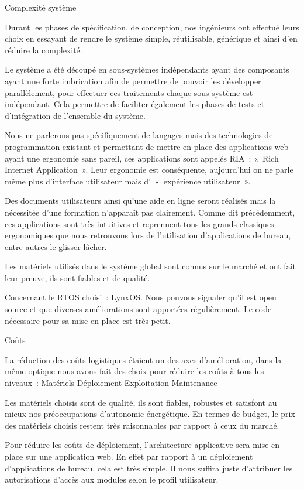 Complexité système


Durant les phases de spécification, de conception, nos ingénieurs ont effectué leurs choix en essayant de rendre le système simple, réutilisable, générique et ainsi d’en réduire la complexité.

Le système a été découpé en sous-systèmes indépendants ayant des composants ayant une forte imbrication afin de permettre de pouvoir les développer parallèlement, pour effectuer ces traitements chaque sous système est indépendant. Cela permettre de faciliter également les phases de tests et d’intégration de l’ensemble du système.

Nous ne parlerons pas spécifiquement de langages mais des technologies de programmation existant et permettant de mettre en place des applications web ayant une ergonomie sans pareil, ces applications sont appelés RIA : « Rich Internet Application ». Leur ergonomie est conséquente, aujourd’hui on ne parle même plus d’interface utilisateur mais d’ « expérience utilisateur ».
	
Des documents utilisateurs ainsi qu’une aide en ligne seront réalisés mais la nécessitée d’une formation n’apparaît pas clairement. Comme dit précédemment, ces applications sont très intuitives et reprennent tous les grands classiques ergonomiques que nous retrouvons lors de l’utilisation d’applications de bureau, entre autres le glisser lâcher.

Les matériels utilisés dans le système global sont connus sur le marché et ont fait leur preuve, ils sont fiables et de qualité.

Concernant le RTOS choisi : LynxOS. Nous pouvons signaler qu’il est open source et que diverses améliorations sont apportées régulièrement. Le code nécessaire pour sa mise en place est très petit.

Coûts

La réduction des coûts logistiques étaient un des axes d’amélioration, dans la même optique nous avons fait des choix pour réduire les coûts à tous les niveaux : 
Matériels
Déploiement
Exploitation
Maintenance

Les matériels choisis sont de qualité, ils sont fiables, robustes et satisfont au mieux nos préoccupations d’autonomie énergétique. En termes de budget, le prix des matériels choisis restent très raisonnables par rapport à ceux du marché.

	Pour réduire les coûts de déploiement, l’architecture applicative sera mise en place sur une application web. En effet par rapport à un déploiement d’applications de bureau, cela est très simple. Il nous suffira juste d’attribuer les autorisations d’accès aux modules selon le profil utilisateur.

